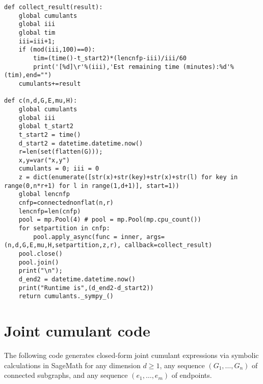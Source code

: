 \documentclass[12pt]{article}
\numberwithin{equation}{section}
\begin{document}
\begin{lstlisting}
def collect_result(result):
    global cumulants
    global iii
    global tim
    iii=iii+1;
    if (mod(iii,100)==0):
        tim=(time()-t_start2)*(lencnfp-iii)/iii/60
        print('[%d]\r'%(iii),'Est remaining time (minutes):%d'%(tim),end="")
    cumulants+=result
	
def c(n,d,G,E,mu,H):
    global cumulants
    global iii
    global t_start2
    t_start2 = time()
    d_start2 = datetime.datetime.now()
    r=len(set(flatten(G)));
    x,y=var("x,y")
    cumulants = 0; iii = 0
    z = dict(enumerate([str(x)+str(key)+str(x)+str(l) for key in range(0,n*r+1) for l in range(1,d+1)], start=1))
    global lencnfp
    cnfp=connectednonflat(n,r)
    lencnfp=len(cnfp)
    pool = mp.Pool(4) # pool = mp.Pool(mp.cpu_count())
    for setpartition in cnfp: 
        pool.apply_async(func = inner, args=(n,d,G,E,mu,H,setpartition,z,r), callback=collect_result)
    pool.close()
    pool.join()
    print("\n");
    d_end2 = datetime.datetime.now()
    print("Runtime is",(d_end2-d_start2))
    return cumulants._sympy_() 
\end{lstlisting}

\section{Joint cumulant code}
\label{fjkldsf-2}
\noindent  
The following code generates closed-form joint cumulant expressions 
via symbolic calculations in SageMath for any dimension $d\geq 1$,
any sequence $(G_1,\ldots ,G_n)$ of
connected subgraphs, and any sequence $(e_1,\ldots, e_m)$ of endpoints. 


\medskip
\end{document}
